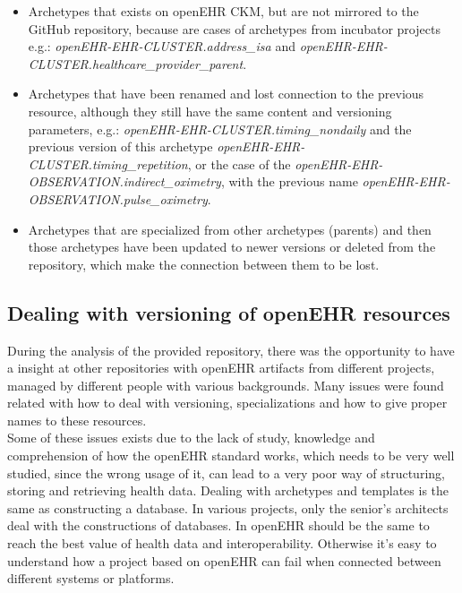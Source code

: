\documentclass[mim_thesis.tex]{subfiles}
\begin{document}
\begin{itemize}
\item Archetypes that exists on openEHR CKM, but are not mirrored to the GitHub repository, because are cases of archetypes from incubator projects e.g.: \textit{openEHR-EHR-CLUSTER.address\_isa} and \textit{openEHR-EHR-CLUSTER.healthcare\_provider\_parent}.
\item Archetypes that have been renamed and lost connection to the previous resource, although they still have the same content and versioning parameters, e.g.: \textit{openEHR-EHR-CLUSTER.timing\_nondaily} and the previous version of this archetype \textit{openEHR-EHR-CLUSTER.timing\_repetition}, or the case of the \textit{openEHR-EHR-OBSERVATION.indirect\_oximetry}, with the previous name \textit{openEHR-EHR-OBSERVATION.pulse\_oximetry}. 
\item Archetypes that are specialized from other archetypes (parents) and then those archetypes have been updated to newer versions or deleted from the repository, which make the connection between them to be lost.
\end{itemize}



\subsection{Dealing with versioning of openEHR resources}

During the analysis of the provided repository, there was the opportunity to have a insight at other repositories with openEHR artifacts from different projects, managed by different people with various backgrounds. Many issues were found related with how to deal with versioning, specializations and how to give proper names to these resources. \\ 

Some of these issues exists due to the lack of study, knowledge and comprehension of how the openEHR standard works, which needs to be very well studied, since the wrong usage of it, can lead to a very poor way of structuring, storing and retrieving health data. Dealing with archetypes and templates is the same as constructing a database. In various projects, only the senior’s architects deal with the constructions of databases. In openEHR 
should be the same to reach the best value of health data and interoperability. Otherwise it’s easy to understand how a project based on openEHR can fail when connected between different systems or platforms. \\
\end{document}
